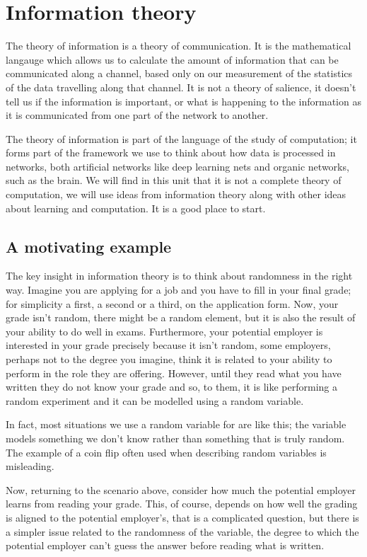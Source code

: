 \documentclass[12pt]{article}
\begin{document}
\section*{Information theory} 

The theory of information is a theory of communication. It is the
mathematical langauge which allows us to calculate the amount of
information that can be communicated along a channel, based only on
our measurement of the statistics of the data travelling along that
channel. It is not a theory of salience, it doesn't tell us if the
information is important, or what is happening to the information as
it is communicated from one part of the network to another.

The theory of information is part of the language of the study of
computation; it forms part of the framework we use to think about how
data is processed in networks, both artificial networks like deep
learning nets and organic networks, such as the brain. We will find in
this unit that it is not a complete theory of computation, we will use
ideas from information theory along with other ideas about learning
and computation. It is a good place to start.

\subsection*{A motivating example}

The key insight in information theory is to think about randomness in
the right way. Imagine you are applying for a job and you have to fill
in your final grade; for simplicity a first, a second or a third, on
the application form. Now, your grade isn't random, there might be a
random element, but it is also the result of your ability to do well
in exams. Furthermore, your potential employer is interested in your
grade precisely because it isn't random, some employers, perhaps not
to the degree you imagine, think it is related to your ability to perform
in the role they are offering. However, until they read what you have
written they do not know your grade and so, to them, it is like
performing a random experiment and it can be modelled using a random
variable.

In fact, most situations we use a random variable for are like this;
the variable models something we don't know rather than something that
is truly random. The example of a coin flip often used when describing
random variables is misleading.

Now, returning to the scenario above, consider how much the potential
employer learns from reading your grade. This, of course, depends on
how well the grading is aligned to the potential employer's, that is a
complicated question, but there is a simpler issue related to the
randomness of the variable, the degree to which the potential employer
can't guess the answer before reading what is written. 
\end{document}

